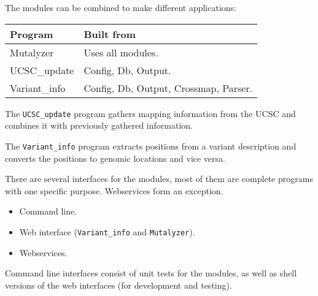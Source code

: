 \documentclass[a4, portrait]{seminar}
\begin{document}
\begin{slide}
The modules can be combined to make different applications:

\vspace{.5cm}
\begin{tabular}{l|l}
Program       & Built from\\
\hline
Mutalyzer     & Uses all modules.\\
UCSC\_update  & Config, Db, Output.\\
Variant\_info & Config, Db, Output, Crossmap, Parser.\\
\end{tabular}

\vspace{1cm}
The {\tt UCSC\_update} program gathers mapping information from the UCSC and
combines it with previously gathered information.

The {\tt Variant\_info} program extracts positions from a variant description 
and converts the positions to genomic locations and vice versa.

\vfill
\end{slide}

\begin{slide}
There are several interfaces for the modules, most of them are complete
programs with one specific purpose. Webservices form an exception.

\vspace{.5cm}
\begin{itemize}
\item Command line.
\item Web interface ({\tt Variant\_info} and {\tt Mutalyzer}).
\item Webservices.
\end{itemize}

\vspace{1cm}
Command line interfaces consist of unit tests for the modules, as well as 
shell versions of the web interfaces (for development and testing).

\vfill
\end{slide}
\end{document}
